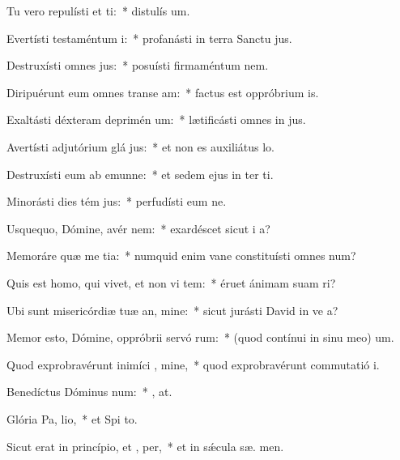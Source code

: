 \item Tu vero repulísti et ti:~* distulís  um.
\item Evertísti testaméntum  i:~* profanásti in terra Sanctu jus.
\item Destruxísti omnes  jus:~* posuísti firmaméntum  nem.
\item Diripuérunt eum omnes transe am:~* factus est oppróbrium  is.
\item Exaltásti déxteram deprimén um:~* lætificásti omnes in jus.
\item Avertísti adjutórium glá jus:~* et non es auxiliátus   lo.
\item Destruxísti eum ab emunne:~* et sedem ejus in ter ti.
\item Minorásti dies tém jus:~* perfudísti eum ne.
\item Usquequo, Dómine, avér  nem:~* exardéscet sicut i  a?
\item Memoráre quæ me tia:~* numquid enim vane constituísti omnes  num?
\item Quis est homo, qui vivet, et non vi tem:~* éruet ánimam suam   ri?
\item Ubi sunt misericórdiæ tuæ an, mine:~* sicut jurásti David in ve a?
\item Memor esto, Dómine, oppróbrii servó rum:~* (quod contínui in sinu meo)  um.
\item Quod exprobravérunt inimíci , mine,~* quod exprobravérunt commutatió  i.
\item Benedíctus Dóminus  num:~* , at.
\item Glória Pa,  lio,~* et Spi to.
\item Sicut erat in princípio, et ,  per,~* et in sǽcula sæ. men.
